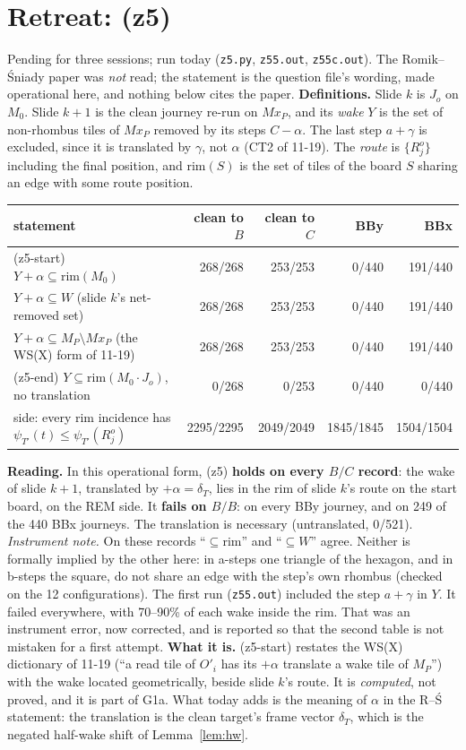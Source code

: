 \documentclass[11pt]{article}
\theoremstyle{definition}\newtheorem{definition}[theorem]{Definition}\newtheorem{remark}[theorem]{Remark}
\begin{document}
\section{Retreat: (z5)}\label{sec:z5}
Pending for three sessions; run today (\texttt{z5.py}, \texttt{z55.out}, \texttt{z55c.out}). The Romik--\'Sniady paper was \emph{not} read; the statement is the question file's wording, made operational here, and nothing below cites the paper.
\textbf{Definitions.} Slide $k$ is $J_o$ on $M_0$. Slide $k+1$ is the clean journey re-run on $Mx_P$, and its \emph{wake} $Y$ is the set of non-rhombus tiles of $Mx_P$ removed by its steps $C-\alpha$. The last step $a+\gamma$ is excluded, since it is translated by $\gamma$, not $\alpha$ (CT2 of 11-19). The \emph{route} is $\{R^o_j\}$ including the final position, and $\mathrm{rim}(S)$ is the set of tiles of the board $S$ sharing an edge with some route position.
\begin{center}\begin{tabular}{lrrrr}\toprule
statement & clean to $B$ & clean to $C$ & BBy & BBx\\\midrule
(z5-start) $Y+\alpha\subseteq\mathrm{rim}(M_0)$ & 268/268 & 253/253 & 0/440 & 191/440\\
$Y+\alpha\subseteq W$ (slide $k$'s net-removed set) & 268/268 & 253/253 & 0/440 & 191/440\\
$Y+\alpha\subseteq M_P\setminus Mx_P$ (the WS(X) form of 11-19) & 268/268 & 253/253 & 0/440 & 191/440\\
(z5-end) $Y\subseteq\mathrm{rim}(M_0\cdot J_o)$, no translation & 0/268 & 0/253 & 0/440 & 0/440\\
side: every rim incidence has $\psi_{T'}(t)\le\psi_{T'}(R^o_j)$ & 2295/2295 & 2049/2049 & 1845/1845 & 1504/1504\\\bottomrule
\end{tabular}\end{center}
\textbf{Reading.} In this operational form, (z5) \textbf{holds on every $B/C$ record}: the wake of slide $k+1$, translated by $+\alpha=\delta_T$, lies in the rim of slide $k$'s route on the start board, on the REM side.
It \textbf{fails on $B/B$}: on every BBy journey, and on 249 of the 440 BBx journeys. The translation is necessary (untranslated, 0/521).
\emph{Instrument note.} On these records ``$\subseteq\mathrm{rim}$'' and ``$\subseteq W$'' agree. Neither is formally implied by the other here: in a-steps one triangle of the hexagon, and in b-steps the square, do not share an edge with the step's own rhombus (checked on the 12 configurations).
The first run (\texttt{z55.out}) included the step $a+\gamma$ in $Y$. It failed everywhere, with 70--90\% of each wake inside the rim. That was an instrument error, now corrected, and is reported so that the second table is not mistaken for a first attempt.
\textbf{What it is.} (z5-start) restates the WS(X) dictionary of 11-19 (``a read tile of $O'_i$ has its $+\alpha$ translate a wake tile of $M_P$'') with the wake located geometrically, beside slide $k$'s route. It is \emph{computed}, not proved, and it is part of G1a. What today adds is the meaning of $\alpha$ in the R--\'S statement: the translation is the clean target's frame vector $\delta_T$, which is the negated half-wake shift of Lemma~\ref{lem:hw}.
\end{document}
